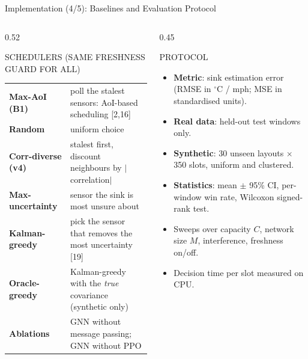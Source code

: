 \documentclass[aspectratio=169,10pt,xcolor=table]{beamer}
\renewcommand{\cite}[1]{{\color{muted}[#1]}}
\newcommand{\sect}[1]{\par{\color{muted}\scriptsize\MakeUppercase{#1}}\par\vspace{0.2em}}
\begin{document}
\begin{frame}{Implementation (4/5): Baselines and Evaluation Protocol}
  \begin{columns}[T]
    \begin{column}{0.52\textwidth}
      \sect{Schedulers (same freshness guard for all)}
      \footnotesize
      \begin{tabularx}{\textwidth}{@{}l>{\raggedright\arraybackslash}X@{}}
        \toprule
        \textbf{Max-AoI (B1)} & poll the stalest sensors: AoI-based scheduling \cite{2,16} \\
        \textbf{Random} & uniform choice \\
        \textbf{Corr-diverse (v4)} & stalest first, discount neighbours by $|$correlation$|$ \\
        \textbf{Max-uncertainty} & sensor the sink is most unsure about \\
        \textbf{Kalman-greedy} & pick the sensor that removes the most uncertainty \cite{19} \\
        \textbf{Oracle-greedy} & Kalman-greedy with the \emph{true} covariance (synthetic only) \\
        \textbf{Ablations} & GNN without message passing; GNN without PPO \\
        \bottomrule
      \end{tabularx}
    \end{column}
    \begin{column}{0.45\textwidth}
      \sect{Protocol}
      \begin{itemize}\small\setlength\itemsep{0.35em}
        \item \textbf{Metric}: sink estimation error (RMSE in $^\circ$C / mph; MSE in standardised units).
        \item \textbf{Real data}: held-out test windows only.
        \item \textbf{Synthetic}: 30 unseen layouts $\times$ 350 slots, uniform and clustered.
        \item \textbf{Statistics}: mean $\pm$ 95\% CI, per-window win rate, Wilcoxon signed-rank test.
        \item Sweeps over capacity $C$, network size $M$, interference, freshness on/off.
        \item Decision time per slot measured on CPU.
      \end{itemize}
    \end{column}
  \end{columns}
\end{frame}
\end{document}
